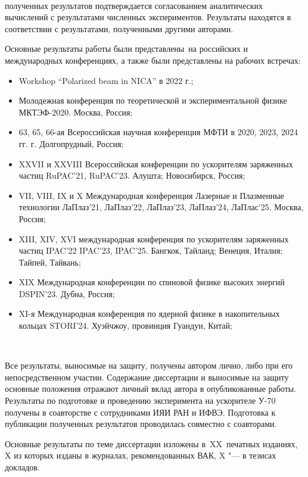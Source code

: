 ~\\
\par {\reliability} полученных результатов подтверждается согласованием аналитических вычислений с результатами численных экспериментов. Результаты находятся в соответствии с результатами, полученными другими авторами.
~\\
\par {\probation}
Основные результаты работы были представлены~на российских и международных конференциях, а также были представлены на рабочих встречах: 
\begin{itemize}
\item Workshop “Polarized beam in NICA” в 2022 г.;
\item Молодежная конференция по теоретической и экспериментальной физике МКТЭФ-2020. Москва, Россия;
\item 63, 65, 66-ая Всероссийская научная конференция МФТИ в 2020, 2023, 2024 гг. г. Долгопрудный,
Россия;
\item XXVII и XXVIII Всероссийская конференции по ускорителям заряженных частиц RuPAC'21, RuPAC'23. Алушта; Новосибирск, Россия;
\item VII, VIII, IX и X Международная конференция Лазерные и Плазменные технологии ЛаПлаз'21, ЛаПлаз'22, ЛаПлаз'23, ЛаПлаз'24, ЛаПлас'25. Москва, Россия;
\item XIII, XIV, XVI международная конференция по ускорителям заряженных частиц IPAC'22 IPAC'23, IPAC'25. Бангкок, Тайланд; Венеция, Италия; Тайпей, Тайвань;
\item XIX Международная конференции по спиновой физике высоких энергий DSPIN'23. Дубна, Россия;
\item XI-я Международная конференция по ядерной физике в накопительных кольцах STORI’24. Хуэйчжоу, провинция Гуандун, Китай;
\end{itemize}
~\\
\par {\contribution} Все результаты, выносимые на защиту, получены автором лично, либо при его непосредственном участии. Содержание диссертации и выносимые на защиту основные положения отражают личный вклад автора в опубликованные работы. Результаты по подготовке и проведению эксперимента на ускорителе У-70 получены в соавторстве с сотрудниками ИЯИ РАН и ИФВЭ. Подготовка к публикации полученных результатов проводилась совместно с соавторами.
~\\
\par {}
{%
 {\publications} Основные результаты по теме диссертации изложены
    в~XX~печатных изданиях,
    X из которых изданы в журналах, рекомендованных ВАК,
    X "--- в тезисах докладов.
}%
